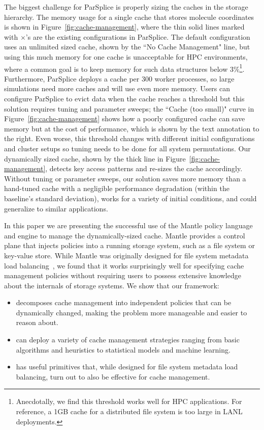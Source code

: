 The biggest challenge for ParSplice is properly sizing the caches in the
storage hierarchy.  The memory usage for a single cache that stores molecule
coordinates is shown in Figure~\ref{fig:cache-management}, where the thin solid
lines marked with \(\times\)'s are the existing configurations in ParSplice.
The default configuration uses an unlimited sized cache, shown by the ``No
Cache Management" line, but using this much memory for one cache is
unacceptable for HPC environments, where a common goal is to keep memory for
such data structures below 3\%\footnote{Anecdotally, we find this threshold
works well for HPC applications.  For reference, a 1GB cache for a distributed
file system is too large in LANL deployments.}. Furthermore, ParSplice deploys
a cache per 300 worker processes, so large simulations need more caches and
will use even more memory.  Users can configure ParSplice to evict data when
the cache reaches a threshold but this solution requires tuning and parameter
sweeps; the ``Cache (too small)" curve in Figure~\ref{fig:cache-management}
shows how a poorly configured cache can save memory but at the cost of
performance, which is shown by the text annotation to the right.  Even worse,
this threshold changes with different initial configurations and cluster setups
so tuning needs to be done for all system permutations.  Our dynamically sized
cache, shown by the thick line in Figure~\ref{fig:cache-management}, detects
key access patterns and re-sizes the cache accordingly.  Without tuning or
parameter sweeps, our solution saves more memory than a hand-tuned cache with a
negligible performance degradation (within the baseline's standard deviation),
works for a variety of initial conditions, and could generalize to similar
applications.

In this paper we are presenting the successful use of the Mantle policy language and engine to manage the dynamically-sized cache. Mantle provides a control plane that
injects policies into a running storage system, such as a file system or key-value store. While Mantle
was originally designed for file system metadata load balancing~\cite{sevilla:sc15-mantle},
we found that it works surprisingly well for specifying cache management policies without requiring users to possess extensive knowledge about the internals of storage systems. We show that our framework:

\begin{itemize}

  \item decomposes cache management into independent policies that can be
  dynamically changed, making the problem more manageable and easier to reason
  about.

  \item can deploy a variety of cache management strategies ranging from basic
  algorithms and heuristics to statistical models and machine learning.

  \item has useful primitives that, while designed for file system metadata
  load balancing, turn out to also be effective for cache management. 

\end{itemize}


